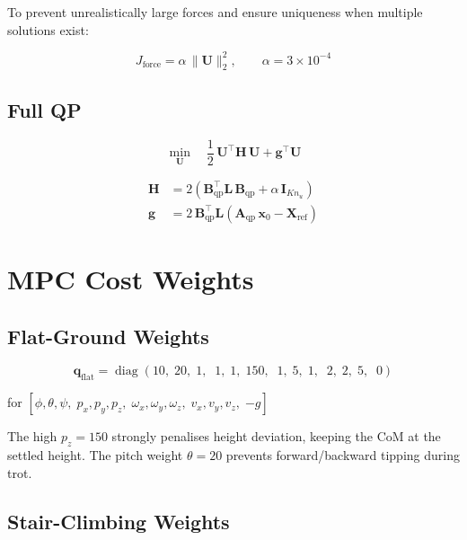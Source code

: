 \documentclass[12pt,a4paper]{report}
\newcommand{\vect}[1]{\bm{#1}}
\newcommand{\mat}[1]{\mathbf{#1}}
\DeclareMathOperator{\diag}{diag}
\begin{document}
To prevent unrealistically large forces and ensure uniqueness when multiple
solutions exist:

\begin{equation}
    J_\text{force} = \alpha\,\|\mat{U}\|^2_2, \qquad \alpha = 3\times10^{-4}
\end{equation}

\subsection{Full QP}

\begin{equation}
    \min_{\mat{U}}\quad \frac{1}{2}\,\mat{U}^\top\mat{H}\,\mat{U} + \vect{g}^\top\mat{U}
    \label{eq:qp_cost}
\end{equation}

\begin{align}
    \mat{H} &= 2\left(\mat{B}_{\mathrm{qp}}^\top\mat{L}\,\mat{B}_{\mathrm{qp}}
               + \alpha\,\mat{I}_{Kn_u}\right) \\
    \vect{g} &= 2\,\mat{B}_{\mathrm{qp}}^\top\mat{L}
               \left(\mat{A}_{\mathrm{qp}}\,\vect{x}_0 - \mat{X}_\text{ref}\right)
\end{align}

\section{MPC Cost Weights}

\subsection{Flat-Ground Weights}

\begin{equation}
    \vect{q}_\text{flat} = \diag(10,\; 20,\; 1,\;\; 1,\; 1,\; 150,\;\; 1,\; 5,\; 1,\;\; 2,\; 2,\; 5,\;\; 0)
\end{equation}

\begin{center}
for $[\phi, \theta, \psi,\; p_x, p_y, p_z,\; \omega_x, \omega_y, \omega_z,\; v_x, v_y, v_z,\; {-g}]$
\end{center}

The high $p_z = 150$ strongly penalises height deviation, keeping the CoM at
the settled height.  The pitch weight $\theta = 20$ prevents forward/backward
tipping during trot.

\subsection{Stair-Climbing Weights}
\end{document}
